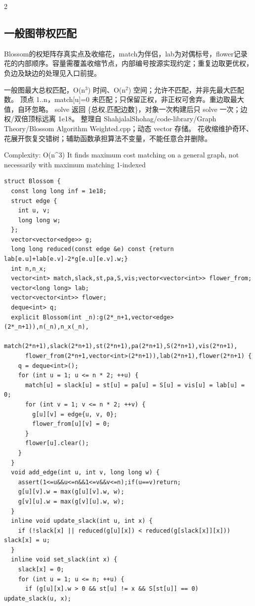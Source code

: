 \documentclass[UTF8,fontset=fandol,a4paper,twoside]{ctexart}
\newcommand{\note}[1]{{\fontsize{10}{12}\selectfont #1\par}}
\begin{document}
\begin{multicols}{2}
\subsection{一般图带权匹配}

\note{Blossom的权矩阵存真实点及收缩花，match为伴侣，lab为对偶标号，flower记录花的内部顺序。容量需覆盖收缩节点，内部编号按源实现约定；重复边取更优权，负边及缺边的处理见入口前提。}
\note{一般图最大总权匹配，O(\allowbreak{}n\ensuremath{^3})\allowbreak{} 时间、O(\allowbreak{}n\ensuremath{^2})\allowbreak{} 空间；允许不匹配，并非先最大匹配数。 顶点 1.\allowbreak{}.\allowbreak{}n，match[\allowbreak{}u]\allowbreak{}=\allowbreak{}0 未匹配；只保留正权，非正权可舍弃。重边取最大值，自环忽略。 solve 返回 \{总权,\allowbreak{}匹配边数\}，对象一次构建后只 solve 一次；边权/\allowbreak{}双倍顶标远离 1e18。 整理自 ShahjalalShohag/\allowbreak{}code-\allowbreak{}library/\allowbreak{}Graph Theory/\allowbreak{}Blossom Algorithm Weighted.\allowbreak{}cpp；动态 vector 存储。 花收缩维护奇环、花展开恢复交错树；辅助函数承担算法不变量，不能任意合并删除。}
\note{Complexity: O(\allowbreak{}n\textasciicircum{}3)\allowbreak{} It finds maximum cost matching on a general graph,\allowbreak{} not necessarily with maximum matching 1-\allowbreak{}indexed}
\begin{lstlisting}
struct Blossom {
  const long long inf = 1e18;
  struct edge {
    int u, v;
    long long w;
  };
  vector<vector<edge>> g;
  long long reduced(const edge &e) const {return lab[e.u]+lab[e.v]-2*g[e.u][e.v].w;}
  int n,n_x;
  vector<int> match,slack,st,pa,S,vis;vector<vector<int>> flower_from;
  vector<long long> lab;
  vector<vector<int>> flower;
  deque<int> q;
  explicit Blossom(int _n):g(2*_n+1,vector<edge>(2*_n+1)),n(_n),n_x(_n),
      match(2*n+1),slack(2*n+1),st(2*n+1),pa(2*n+1),S(2*n+1),vis(2*n+1),
      flower_from(2*n+1,vector<int>(2*n+1)),lab(2*n+1),flower(2*n+1) {
    q = deque<int>();
    for (int u = 1; u <= n * 2; ++u) {
      match[u] = slack[u] = st[u] = pa[u] = S[u] = vis[u] = lab[u] = 0;
      for (int v = 1; v <= n * 2; ++v) {
        g[u][v] = edge{u, v, 0};
        flower_from[u][v] = 0;
      }
      flower[u].clear();
    }
  }
  void add_edge(int u, int v, long long w) {
    assert(1<=u&&u<=n&&1<=v&&v<=n);if(u==v)return;
    g[u][v].w = max(g[u][v].w, w);
    g[v][u].w = max(g[v][u].w, w);
  }
  inline void update_slack(int u, int x) {
    if (!slack[x] || reduced(g[u][x]) < reduced(g[slack[x]][x])) slack[x] = u;
  }
  inline void set_slack(int x) {
    slack[x] = 0;
    for (int u = 1; u <= n; ++u) {
      if (g[u][x].w > 0 && st[u] != x && S[st[u]] == 0) update_slack(u, x);

\end{lstlisting}
\end{multicols}
\end{document}
